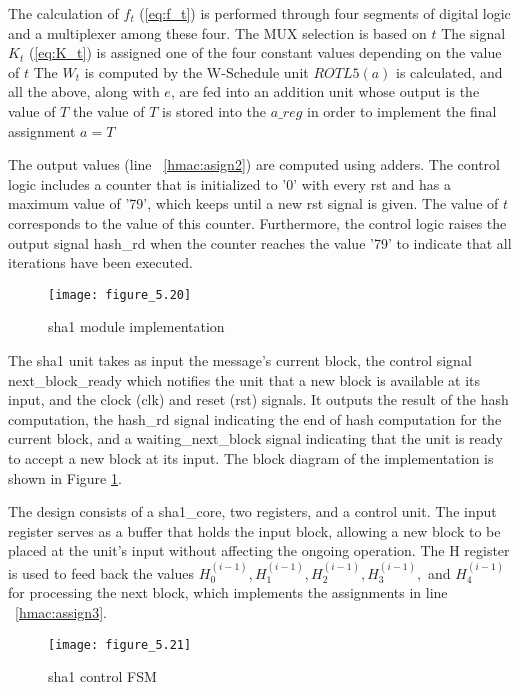 \begin{outline}
    \1 The calculation of $f_t$ (\ref{eq:f_t}) is performed through four segments of digital logic and a multiplexer among these four. The MUX selection is based on $t$
    \1 The signal $K_t$ (\ref{eq:K_t}) is assigned one of the four constant values depending on the value of $t$
    \1 The $W_t$ is computed by the W-Schedule unit
    \1 $ROTL5(a)$ is calculated, and all the above, along with $e$, are fed into an addition unit whose output is the value of $T$ 
    \1 the value of $T$ is stored into the $a\_reg$ in order to implement the final assignment $a = T$
\end{outline}

The output values (line ~\ref{hmac:asign2}) are computed using adders. The control logic includes a counter that is initialized to '0' with every rst and has a maximum value of '79', which keeps until a new rst signal is given. The value of $t$ corresponds to the value of this counter. Furthermore, the control logic raises the output signal hash\_rd when the counter reaches the value '79' to indicate that all iterations have been executed.

\begin{figure}[H]
\centering
\texttt{[image: figure\_5.20]}\\
\caption{ sha1 module implementation}
\label{fig:figure_5.20}
\end{figure}

The sha1 unit takes as input the message's current block, the control signal next\_block\_ready which notifies the unit that a new block is available at its input, and the clock (clk) and reset (rst) signals. It outputs the result of the hash computation, the hash\_rd signal indicating the end of hash computation for the current block, and a waiting\_next\_block signal indicating that the unit is ready to accept a new block at its input. The block diagram of the implementation is shown in Figure \ref{fig:figure_5.20}.

The design consists of a sha1\_core, two registers, and a control unit. The input register serves as a buffer that holds the input block, allowing a new block to be placed at the unit's input without affecting the ongoing operation. The H register is used to feed back the values $H_0^{(i-1)}, H_1^{(i-1)}, H_2^{(i-1)}, H_3^{(i-1)},$ and $H_4^{(i-1)}$ for processing the next block, which implements the assignments in line ~\ref{hmac:assign3}.

\begin{figure}
\centering
\texttt{[image: figure\_5.21]}\\
\caption{  sha1 control FSM }
\label{fig:figure_5.21}
\end{figure}

